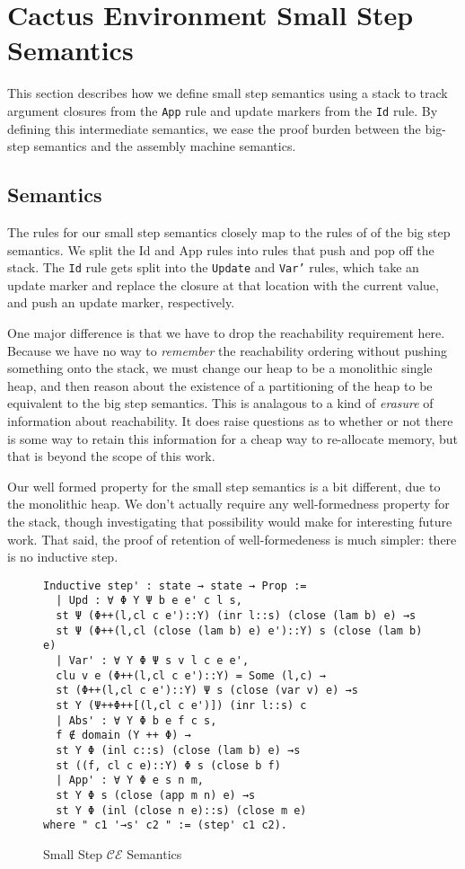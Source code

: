 \section{Cactus Environment Small Step Semantics}

This section describes how we define small step semantics using a stack to track
argument closures from the \texttt{App} rule and update markers from the
\texttt{Id} rule. By defining this intermediate semantics, we ease the proof
burden between the big-step semantics and the assembly machine semantics.   

\subsection{Semantics}

The rules for our small step semantics closely map to the rules of of the big
step semantics. We split the Id and App rules into rules that push and pop off
the stack. The \texttt{Id} rule gets split into the \texttt{Update} and
\texttt{Var'} rules, which take an update marker and replace the closure at that
location with the current value, and push an update marker, respectively. 

One major difference is that we have to drop the reachability requirement here.
Because we have no way to \emph{remember} the reachability ordering without
pushing something onto the stack, we must change our heap to be a monolithic
single heap, and then reason about the existence of a partitioning of the heap
to be equivalent to the big step semantics. This is analagous to a kind of
\emph{erasure} of information about reachability. It does raise questions as to
whether or not there is some way to retain this information for a cheap way to
re-allocate memory, but that is beyond the scope of this work.

Our well formed property for the small step semantics is a bit different, due to
the monolithic heap. We don't actually require any well-formedness property for
the stack, though investigating that possibility would make for interesting
future work. That said, the proof of retention of well-formedeness is much
simpler: there is no inductive step.   

\begin{figure}
\begin{lstlisting}
Inductive step' : state → state → Prop :=
  | Upd : ∀ Φ Υ Ψ b e e' c l s, 
  st Ψ (Φ++(l,cl c e')::Υ) (inr l::s) (close (lam b) e) →s 
  st Ψ (Φ++(l,cl (close (lam b) e) e')::Υ) s (close (lam b) e)
  | Var' : ∀ Υ Φ Ψ s v l c e e', 
  clu v e (Φ++(l,cl c e')::Υ) = Some (l,c) → 
  st (Φ++(l,cl c e')::Υ) Ψ s (close (var v) e) →s 
  st Υ (Ψ++Φ++[(l,cl c e')]) (inr l::s) c
  | Abs' : ∀ Υ Φ b e f c s, 
  f ∉ domain (Υ ++ Φ) → 
  st Υ Φ (inl c::s) (close (lam b) e) →s 
  st ((f, cl c e)::Υ) Φ s (close b f)
  | App' : ∀ Υ Φ e s n m, 
  st Υ Φ s (close (app m n) e) →s 
  st Υ Φ (inl (close n e)::s) (close m e)
where " c1 '→s' c2 " := (step' c1 c2).
\end{lstlisting}
\caption{Small Step $\mathcal{CE}$ Semantics}
\end{figure}

